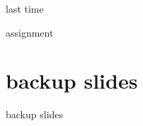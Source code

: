 \date{}
\title{}
\date{}

\begin{frame}
    \titlepage
\end{frame}

\begin{frame}{last time}
\end{frame}





\begin{frame}{assignment}
\end{frame}




\section{backup slides}
\begin{frame}{backup slides}
\end{frame}


